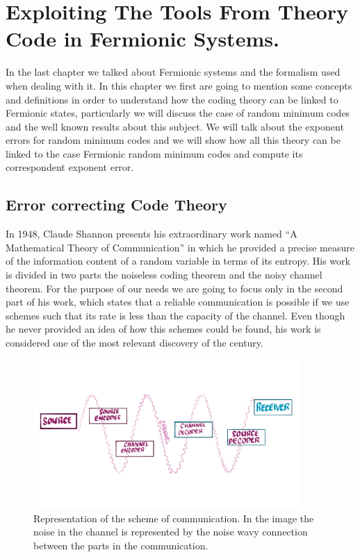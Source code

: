 \chapter{Exploiting The Tools From Theory Code in Fermionic Systems.}
In the last chapter we talked about Fermionic systems and the formalism used when dealing with it. In this chapter we first are going to  mention some concepts and definitions in order to understand how the coding theory can be linked to Fermionic states, particularly we will discuss the case of random minimum codes and the well known results about this subject. We will talk about the exponent errors for random minimum codes and we will show how all this theory can be linked to the case Fermionic random minimum codes and compute its correspondent exponent error. 

\section{Error correcting Code Theory}
In 1948, Claude Shannon presents his extraordinary work named ``A Mathematical Theory of Communication'' \cite{shannon_mathematical_1948} in which he provided a precise measure of the information content of a random variable in terms of its entropy.  His work is divided in two parts the noiseless coding theorem and the noisy channel theorem. For the purpose of our needs we are going to focus only in the second part of his work, which states that a reliable communication is possible if we use schemes such that its rate is less than the capacity of the channel. Even though he never provided an idea of how this schemes could be found, his work is considered one of the most relevant discovery of the century.
\begin{figure}
\centering
\includegraphics[width=0.9\textwidth]{Figures/Source_Destination.png}
\caption{Representation of the scheme of communication. In the image the noise in the channel is represented by the noise wavy connection between the parts in the communication. }
\label{CH2:Channel_communication}
\end{figure}
